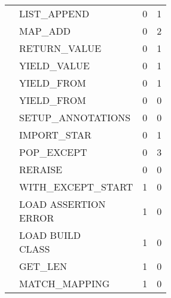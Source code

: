 \begin{longtable}{|p{4cm}|p{4cm}|p{2cm}|p{2cm}|  }
    \cline{2-4} & 

    LIST\_APPEND&0&1\\

    \cline{2-4} & 

    MAP\_ADD&0&2\\
    
    \cline{2-4} & 

    RETURN\_VALUE&0&1\\
    
    \cline{2-4} & 

    YIELD\_VALUE&0&1\\
    
    \cline{2-4} & 

    YIELD\_FROM&0&1\\
    
    \cline{2-4} &

    YIELD\_FROM&0&0\\
    
    \cline{2-4} &

    SETUP\_ANNOTATIONS&0&0\\
    
    \cline{2-4} &

    IMPORT\_STAR&0&1\\
    
    \cline{2-4} &

    POP\_EXCEPT&0&3\\
  
    \cline{2-4} &

    RERAISE&0&0\\
    
    \cline{2-4} &

    WITH\_EXCEPT\_START&1&0\\
    
    \cline{2-4} &

    \makecell{LOAD ASSERTION \\ ERROR}&1&0\\
    
    \cline{2-4} &

    \makecell{LOAD BUILD \\ CLASS}&1&0\\
    
    \cline{2-4} &

    GET\_LEN&1&0\\
    
    \cline{2-4} &

    MATCH\_MAPPING&1&0\\
    

\end{longtable}
